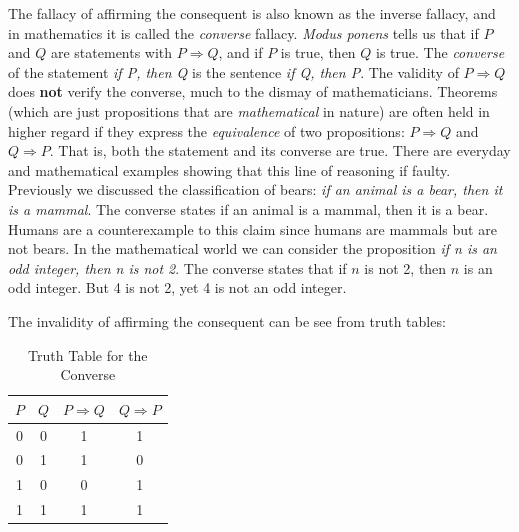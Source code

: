         \begin{example}
            \label{ex:Affirming_the_Consequent}%
            The fallacy of affirming the consequent is also known as the
            inverse fallacy, and in
            mathematics it is called the \textit{converse}
            fallacy.
            \textit{Modus ponens} tells us that if $P$ and $Q$ are statements
            with $P\Rightarrow{Q}$, and if $P$ is true, then $Q$ is true. The
            \textit{converse} of the statement
            \textit{if P, then Q} is the sentence \textit{if Q, then P}. The
            validity of $P\Rightarrow{Q}$ does \textbf{not} verify the converse,
            much to the dismay of mathematicians. Theorems (which are just
            propositions that are \textit{mathematical} in nature) are often
            held in higher regard if they express the \textit{equivalence} of
            two propositions: $P\Rightarrow{Q}$ and $Q\Rightarrow{P}$. That is,
            both the statement and its converse are true. There are everyday and
            mathematical examples showing that this line of reasoning if faulty.
            Previously we discussed the classification of bears:
            \textit{if an animal is a bear, then it is a mammal}. The converse
            states if an animal is a mammal, then it is a bear. Humans are a
            counterexample to this claim since humans are mammals but are not
            bears. In the mathematical world we can consider the proposition
            \textit{if n is an odd integer, then n is not 2}. The converse
            states that if $n$ is not 2, then $n$ is an odd integer. But 4 is
            not 2, yet 4 is not an odd integer.
        \end{example}
        The invalidity of affirming the consequent can be see from truth tables:
        \begin{table}[H]
            \centering
            \captionsetup{type=table}
            \begin{tabular}{c|c|c|c}
                $P$&$Q$&$P\Rightarrow{Q}$&$Q\Rightarrow{P}$\\
                \hline
                0&0&1&1\\
                0&1&1&0\\
                1&0&0&1\\
                1&1&1&1
            \end{tabular}
            \caption{Truth Table for the Converse}
            \label{tab:Truth_Table_Converse}
        \end{table}
